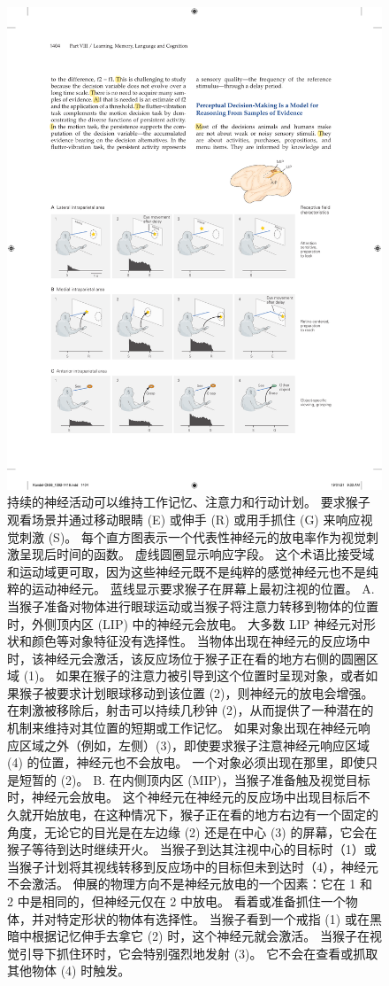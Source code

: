 \begin{figure}[htbp]
	\centering
	\includegraphics[width=0.95\linewidth]{chap56/fig_56_7}
	\caption{持续的神经活动可以维持工作记忆、注意力和行动计划。 要求猴子观看场景并通过移动眼睛 (E) 或伸手 (R) 或用手抓住 (G) 来响应视觉刺激 (S)。 每个直方图表示一个代表性神经元的放电率作为视觉刺激呈现后时间的函数。 虚线圆圈显示响应字段。 这个术语比接受域和运动域更可取，因为这些神经元既不是纯粹的感觉神经元也不是纯粹的运动神经元。 蓝线显示要求猴子在屏幕上最初注视的位置。 A. 当猴子准备对物体进行眼球运动或当猴子将注意力转移到物体的位置时，外侧顶内区 (LIP) 中的神经元会放电。 大多数 LIP 神经元对形状和颜色等对象特征没有选择性。 当物体出现在神经元的反应场中时，该神经元会激活，该反应场位于猴子正在看的地方右侧的圆圈区域 (1)。 如果在猴子的注意力被引导到这个位置时呈现对象，或者如果猴子被要求计划眼球移动到该位置 (2)，则神经元的放电会增强。 在刺激被移除后，射击可以持续几秒钟 (2)，从而提供了一种潜在的机制来维持对其位置的短期或工作记忆。 如果对象出现在神经元响应区域之外（例如，左侧）(3)，即使要求猴子注意神经元响应区域 (4) 的位置，神经元也不会放电。 一个对象必须出现在那里，即使只是短暂的 (2)。 B. 在内侧顶内区 (MIP)，当猴子准备触及视觉目标时，神经元会放电。 这个神经元在神经元的反应场中出现目标后不久就开始放电，在这种情况下，猴子正在看的地方右边有一个固定的角度，无论它的目光是在左边缘 (2) 还是在中心 (3) 的屏幕，它会在猴子等待到达时继续开火。 当猴子到达其注视中心的目标时（1）或当猴子计划将其视线转移到反应场中的目标但未到达时（4），神经元不会激活。 伸展的物理方向不是神经元放电的一个因素：它在 1 和 2 中是相同的，但神经元仅在 2 中放电。 看着或准备抓住一个物体，并对特定形状的物体有选择性。 当猴子看到一个戒指 (1) 或在黑暗中根据记忆伸手去拿它 (2) 时，这个神经元就会激活。 当猴子在视觉引导下抓住环时，它会特别强烈地发射 (3)。 它不会在查看或抓取其他物体 (4) 时触发。}
	\label{fig:56_7}
\end{figure}

